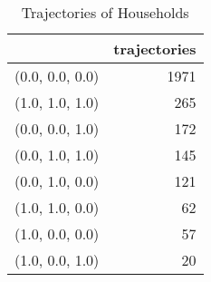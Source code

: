 \begin{table}
\centering
\caption{Trajectories of Households}
\label{tbl:trajectories}
\begin{tabular}{lr}
\toprule
{} &  trajectories \\
\midrule
(0.0, 0.0, 0.0) &          1971 \\
(1.0, 1.0, 1.0) &           265 \\
(0.0, 0.0, 1.0) &           172 \\
(0.0, 1.0, 1.0) &           145 \\
(0.0, 1.0, 0.0) &           121 \\
(1.0, 1.0, 0.0) &            62 \\
(1.0, 0.0, 0.0) &            57 \\
(1.0, 0.0, 1.0) &            20 \\
\bottomrule
\end{tabular}
\end{table}
